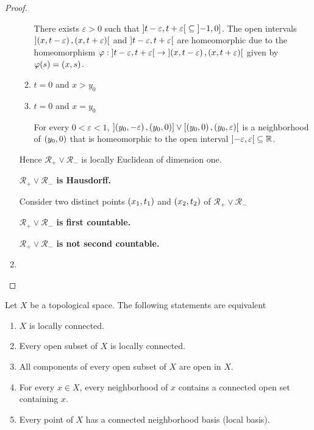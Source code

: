 \begin{proof}
\begin{enumerate}[label={(\alph*)}]
\begin{enumerate}[label={\textbf{Case \arabic*.}},itemindent=1cm]
			            There exists $\varepsilon > 0$ such that $\left]{t - \varepsilon, t + \varepsilon}\right[ \subseteq \left]{-1, 0}\right]$. The open intervals $\left]{\left({x, t - \varepsilon}\right), \left({x, t + \varepsilon}\right)}\right[$ and $\left]{t - \varepsilon, t + \varepsilon}\right[$ are homeomorphic due to the homeomorphism $\varphi: \left]{t - \varepsilon, t + \varepsilon}\right[ \to \left]{\left({x, t - \varepsilon}\right), \left({x, t + \varepsilon}\right)}\right[$ given by $\varphi(s) = \left({x, s}\right)$.
			      \item $t = 0$ and $x > y_{0}$
				  \item $t = 0$ and $x = y_{0}$

				        For every $0 < \varepsilon < 1$, $\left]{\left({y_{0}, -\varepsilon}\right), \left({y_{0}, 0}\right)}\right] \vee \left[{\left({y_{0}, 0}\right), \left({y_{0}, \varepsilon}\right)}\right[$ is a neighborhood of $\left({y_{0}, 0}\right)$ that is homeomorphic to the open interval $\left]{-\varepsilon, \varepsilon}\right[ \subseteq \mathbb{R}$.
		      \end{enumerate}

			  Hence $\mathscr{R}_{+} \vee \mathscr{R}_{-}$ is locally Euclidean of dimension one.

		      \textbf{$\mathscr{R}_{+} \vee \mathscr{R}_{-}$ is Hausdorff.}

			  Consider two distinct points $\left({x_{1}, t_{1}}\right)$ and $\left({x_{2}, t_{2}}\right)$ of $\mathscr{R}_{+} \vee \mathscr{R}_{-}$

		      \textbf{$\mathscr{R}_{+} \vee \mathscr{R}_{-}$ is first countable.}

		      \textbf{$\mathscr{R}_{+} \vee \mathscr{R}_{-}$ is not second countable.}
		\item
	\end{enumerate}
\end{proof}

\begin{note}\label{note:characterizations-of-local-connectedness}
	Let $X$ be a topological space. The following statements are equivalent
	\begin{enumerate}[label={(\alph*)}]
		\item $X$ is locally connected.
		\item Every open subset of $X$ is locally connected.
		\item All components of every open subset of $X$ are open in $X$.
		\item For every $x\in X$, every neighborhood of $x$ contains a connected open set containing $x$.
		\item Every point of $X$ has a connected neighborhood basis (local basis).
	\end{enumerate}
\end{note}

